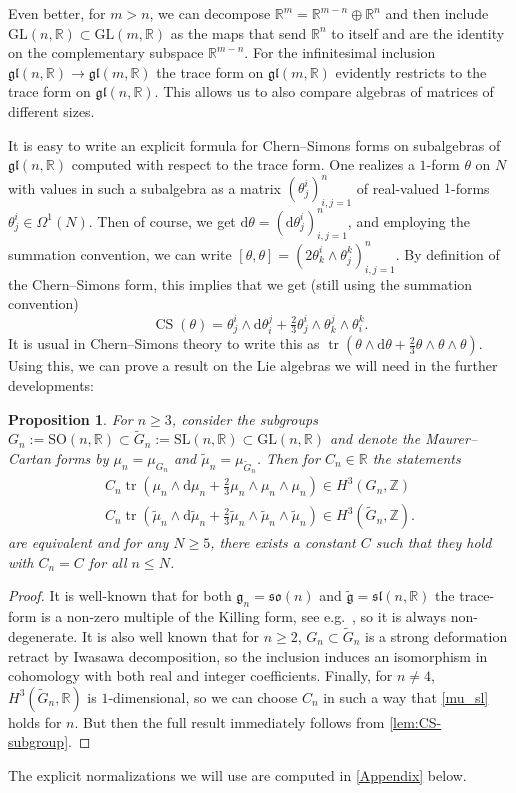 \documentclass[british,11pt,a4paper]{amsart}
\numberwithin{equation}{section}
\renewcommand\frak{\mathfrak}
\renewcommand\Bbb{\mathbb}
\renewcommand{\th}{\theta}
\newcommand{\deq}{:=}
\newcommand{\Om}{\Omega}
\newcommand{\CS}{\operatorname{CS}}
\newcommand{\tr}{\operatorname{tr}}
\newcommand{\Z}{\mathbb{Z}}
\renewcommand*{\d}{\mathrm{d}}
\newcommand*{\R}{\mathbb{R}}
\newcounter{theorem}
\numberwithin{theorem}{section}
\newtheorem{prop}[theorem]{Proposition}
\theoremstyle{definition}
\theoremstyle{remark}
\begin{document}
Even better, for $m>n$, we can decompose $\R^m=\R^{m-n}\oplus\R^n$ and
then include $\mathrm{GL}(n,\R)\subset \mathrm{GL}(m,\R)$ as the maps that send $\R^n$ to itself and
are the identity on the complementary subspace $\R^{m-n}$. For the infinitesimal
inclusion $\frak{gl}(n,\R)\to\frak{gl}(m,\R)$ the trace form on $\frak{gl}(m,\R)$
evidently restricts to the trace form on $\frak{gl}(n,\Bbb R)$. This allows us to
also compare algebras of matrices of different sizes.

It is easy to write an explicit formula for Chern--Simons forms on subalgebras of
$\frak{gl}(n,\R)$ computed with respect to the trace form. One realizes a
$1$-form $\th$ on $N$ with values in such a subalgebra as a matrix
$(\th^i_j)_{i,j=1}^n$ of real-valued $1$-forms $\th^i_j\in\Om^1(N)$. Then of course,
we get $\d\th=(\d\th^i_j)_{i,j=1}^n$, and employing the summation convention, we can
write $[\th,\th]=(2\th^i_k\wedge\th^k_j)_{i,j=1}^n$. By definition of the Chern--Simons
form, this implies that we get (still using the summation convention)
\[
\CS(\th)=\th^i_j\wedge\d\th^j_i+\tfrac{2}{3}\th^i_j\wedge\th^j_k\wedge\th^k_i. 
\]
It is usual in Chern--Simons theory to write this as $\tr(\th\wedge
\d\th+\tfrac{2}{3}\th\wedge\th\wedge\th)$. Using this, we can prove a result on the
Lie algebras we will need in the further developments: 

\begin{prop}\label{prop:sl-so}
For $n\geqslant 3$, consider the subgroups $G_n\deq\mathrm{SO}(n,\R)\subset\tilde G_n\deq\mathrm{SL}(n,\Bbb
R)\subset \mathrm{GL}(n,\R)$ and denote the Maurer--Cartan forms by $\mu_n=\mu_{G_n}$
and $\tilde\mu_n=\mu_{\tilde G_n}$. Then for $C_n\in\R$ the statements 
\begin{gather}
C_n\tr\left(\mu_n\wedge \d\mu_n+\frac{2}{3}\mu_n\wedge\mu_n\wedge\mu_n\right)\in
H^3(G_n,\Z)\label{mu_so}\\ C_n\tr\left(\tilde\mu_n\wedge
\d\tilde\mu_n+\frac{2}{3}\tilde\mu_n\wedge\tilde\mu_n\wedge\tilde\mu_n\right)\in
H^3(\tilde G_n,\Z)\label{mu_sl}.
\end{gather}
are equivalent and for any $N\geqslant 5$, there exists a constant $C$ such that they hold
with $C_n=C$ for all $n\leqslant N$.
\end{prop}
\begin{proof}
It is well-known that for both $\frak{g}_n=\frak{so}(n)$ and $\tilde{\frak
g}=\frak{sl}(n,\R)$ the trace-form is a non-zero multiple of the Killing
form, see e.g.\ \cite{MR1153249}, so it is always non-degenerate. It is also well
known that for $n\geqslant 2$, $G_n\subset\tilde G_n$ is a strong deformation retract by
Iwasawa decomposition, so the inclusion induces an isomorphism in cohomology with
both real and integer coefficients. Finally, for $n\neq 4$, $H^3(\tilde G_n,\Bbb
R)$ is $1$-dimensional, so we can choose $C_n$ in such a way that \eqref{mu_sl}
holds for $n$. But then the full result immediately follows from
\cref{lem:CS-subgroup}.
\end{proof}
 The explicit normalizations we will use are computed in \cref{Appendix}
below.
\end{document}
